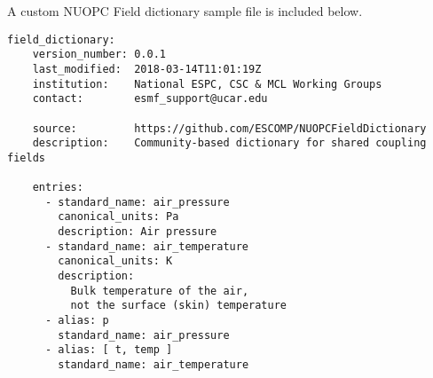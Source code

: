 A custom NUOPC Field dictionary sample file is included below.

\begin{verbatim}
field_dictionary:
    version_number: 0.0.1
    last_modified:  2018-03-14T11:01:19Z
    institution:    National ESPC, CSC & MCL Working Groups
    contact:        esmf_support@ucar.edu

    source:         https://github.com/ESCOMP/NUOPCFieldDictionary
    description:    Community-based dictionary for shared coupling fields

    entries:
      - standard_name: air_pressure
        canonical_units: Pa
        description: Air pressure
      - standard_name: air_temperature
        canonical_units: K
        description:
          Bulk temperature of the air,
          not the surface (skin) temperature
      - alias: p
        standard_name: air_pressure
      - alias: [ t, temp ]
        standard_name: air_temperature
\end{verbatim}
